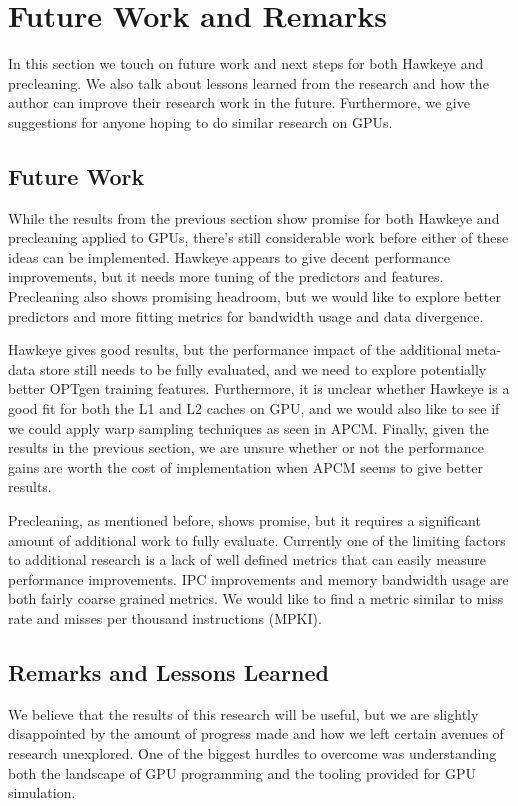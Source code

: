 \chapter{Future Work and Remarks}
In this section we touch on future work and next steps for both Hawkeye and precleaning. We also talk about lessons learned from the research and how the author can improve their research work in the future. Furthermore, we give suggestions for anyone  hoping to do similar research on GPUs.

\section{Future Work}
While the results from the previous section show promise for both Hawkeye and precleaning applied to GPUs, there's still considerable work before either of these ideas can be implemented. Hawkeye appears to give decent performance improvements, but it needs more tuning of the predictors and features. Precleaning also shows promising headroom, but we would like to explore better predictors and more fitting metrics for bandwidth usage and data divergence.

Hawkeye gives good results, but the performance impact of the additional meta-data store still needs to be fully evaluated, and we need to explore potentially better OPTgen training features. Furthermore, it is unclear whether Hawkeye is a good fit for both the L1 and L2 caches on GPU, and we would also like to see if we could apply warp sampling techniques as seen in APCM. Finally, given the results in the previous section, we are unsure whether or not the performance gains are worth the cost of implementation when APCM seems to give better results.

Precleaning, as mentioned before, shows promise, but it requires a significant amount of additional work to fully evaluate. Currently one of the limiting factors to additional research is a lack of well defined metrics that can easily measure performance improvements. IPC improvements and memory bandwidth usage are both fairly coarse grained metrics. We would like to find a metric similar to miss rate and misses per thousand instructions (MPKI). 

\section{Remarks and Lessons Learned}
We believe that the results of this research will be useful, but we are slightly disappointed by the amount of progress made and how we left certain avenues of research unexplored. One of the biggest hurdles to overcome was understanding both the landscape of GPU programming and the tooling provided for GPU simulation.

